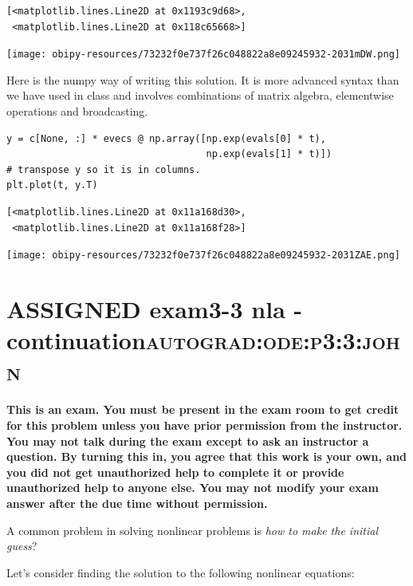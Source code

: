 \documentclass[11pt]{article}
\begin{document}
\begin{verbatim}
[<matplotlib.lines.Line2D at 0x1193c9d68>,
 <matplotlib.lines.Line2D at 0x118c65668>]
\end{verbatim}



\begin{center}
\texttt{[image: obipy-resources/73232f0e737f26c048822a8e09245932-2031mDW.png]}
\end{center}


Here is the numpy way of writing this solution. It is more advanced syntax than we have used in class and involves combinations of matrix algebra, elementwise operations and broadcasting.

\begin{verbatim}
y = c[None, :] * evecs @ np.array([np.exp(evals[0] * t),
                                   np.exp(evals[1] * t)])
# transpose y so it is in columns.
plt.plot(t, y.T)
\end{verbatim}

\begin{verbatim}
[<matplotlib.lines.Line2D at 0x11a168d30>,
 <matplotlib.lines.Line2D at 0x11a168f28>]
\end{verbatim}



\begin{center}
\texttt{[image: obipy-resources/73232f0e737f26c048822a8e09245932-2031ZAE.png]}
\end{center}




\section{{\bfseries\sffamily ASSIGNED} exam3-3 nla - continuation\hfill{}\textsc{autograd:ode:p3:3:john}}
\label{sec:org5d6658b}
\textbf{This is an exam. You must be present in the exam room to get credit for this problem unless you have prior permission from the instructor. You may not talk during the exam except to ask an instructor a question. By turning this in, you agree that this work is your own, and you did not get unauthorized help to complete it or provide unauthorized help to anyone else. You may not modify your exam answer after the due time without permission.}

A common problem in solving nonlinear problems is \emph{how to make the initial guess}?

Let's consider finding the solution to the following nonlinear equations:
\end{document}
